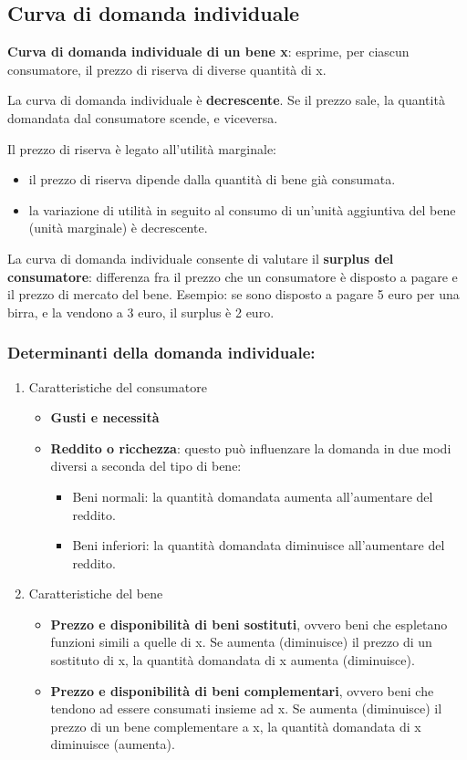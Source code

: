 \documentclass[../main.tex]{subfiles}
\begin{document}
\subsection{Curva di domanda individuale}

\textbf{Curva di domanda individuale di un bene x}: esprime, per ciascun consumatore, il prezzo di riserva di diverse quantità di x.

La curva di domanda individuale è \textbf{decrescente}. Se il prezzo sale, la quantità domandata dal consumatore scende, e viceversa.

Il prezzo di riserva è legato all'utilità marginale:
\begin{itemize}
\item  il prezzo di riserva dipende dalla quantità di bene già consumata.
\item la variazione di utilità in seguito al consumo di un'unità aggiuntiva del bene (unità marginale) è decrescente.
\end{itemize}

La curva di domanda individuale consente di valutare il \textbf{surplus del consumatore}: differenza fra il prezzo che un consumatore è disposto a pagare e il prezzo di mercato del bene. Esempio: se sono disposto a pagare 5 euro per una birra, e la vendono a 3 euro, il surplus è 2 euro.\\

\subsubsection{Determinanti della domanda individuale:}
\begin{enumerate}
\item Caratteristiche del consumatore
	\begin{itemize}
	\item \textbf{Gusti e necessità}
	\item \textbf{Reddito o ricchezza}: questo può influenzare la domanda in due modi diversi a seconda del tipo di bene:
		\begin{itemize}
		\item Beni normali: la quantità domandata aumenta all'aumentare del reddito.
		\item Beni inferiori: la quantità domandata diminuisce all'aumentare del reddito.
		\end{itemize}
	\end{itemize}
\item Caratteristiche del bene
	\begin{itemize}
	\item \textbf{Prezzo e disponibilità di beni sostituti}, ovvero beni che espletano funzioni simili a quelle di x. Se aumenta (diminuisce) il prezzo di un sostituto di x, la quantità domandata di x aumenta (diminuisce).
	\item \textbf{Prezzo e disponibilità di beni complementari}, ovvero beni che tendono ad essere consumati insieme ad x. Se aumenta (diminuisce) il prezzo di un bene complementare a x, la quantità domandata di x diminuisce (aumenta).
	\end{itemize}
\end{enumerate}
\end{document}
